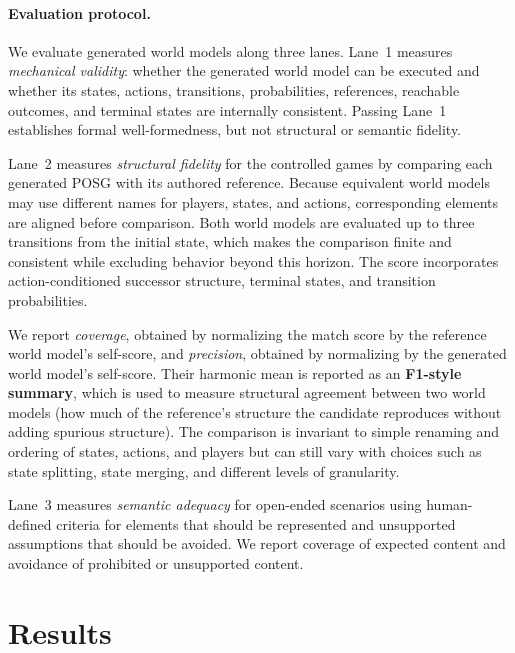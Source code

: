\documentclass{article}
\begin{document}
\paragraph{Evaluation protocol.}
We evaluate generated world models along three lanes. Lane~1 measures \emph{mechanical validity}: whether the generated world model can be executed and whether its states, actions, transitions, probabilities, references, reachable outcomes, and terminal states are internally consistent. Passing Lane~1 establishes formal well-formedness, but not structural or semantic fidelity.

Lane~2 measures \emph{structural fidelity} for the controlled games by comparing each generated POSG with its authored reference. Because equivalent world models may use different names for players, states, and actions, corresponding elements are aligned before comparison. Both world models are evaluated up to three transitions from the initial state, which makes the comparison finite and consistent while excluding behavior beyond this horizon. The score incorporates action-conditioned successor structure, terminal states, and transition probabilities.

We report \emph{coverage}, obtained by normalizing the match score by the reference world model's self-score, and \emph{precision}, obtained by normalizing by the generated world model's self-score. Their harmonic mean is reported as an \textbf{F1-style summary}, which is used to measure structural agreement between two world models (how much of the reference's structure the candidate reproduces without adding spurious structure).  The comparison is invariant to simple renaming and ordering of states, actions, and players but can still vary with choices such as state splitting, state merging, and different levels of granularity.

Lane~3 measures \emph{semantic adequacy} for open-ended scenarios using human-defined criteria for elements that should be represented and unsupported assumptions that should be avoided. We report coverage of expected content and avoidance of prohibited or unsupported content.
 
\section{Results}
\label{sec:results}
\end{document}
